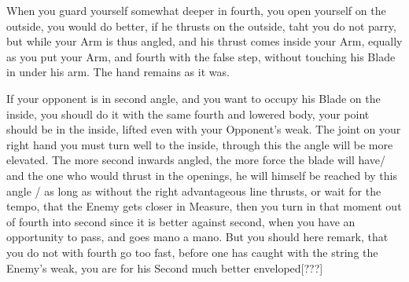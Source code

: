 
When you guard yourself somewhat deeper in fourth, you open yourself
on the outside, you would do better, if he thrusts on the outside,
taht you do not parry, but while your Arm is thus angled, and his
thrust comes inside your Arm, equally as you put your Arm, and fourth
with the false step, without touching his Blade in under his arm. The
hand remains as it was.

If your opponent is in second angle,
and you want to occupy his Blade on the inside, you shoudl do it with
the same fourth and lowered body, your point should be in the inside,
lifted even with your Opponent's weak. The joint on your right hand
you must turn well to the inside, through this the angle will be more
elevated. The more second inwards angled, the more force the blade
will have/ and the one who would thrust in the openings, he will
himself be reached by this angle / as long as without  the right
advantageous line thrusts, or wait for the tempo, that the Enemy gets
closer in Measure, then you turn in that moment out of fourth into
second since it is better against second, when you have an opportunity
to pass, and goes mano a mano. But you should here remark, that you do not with fourth go too
fast, before one has caught with the string the Enemy's weak, you are
for his Second much better enveloped[???]